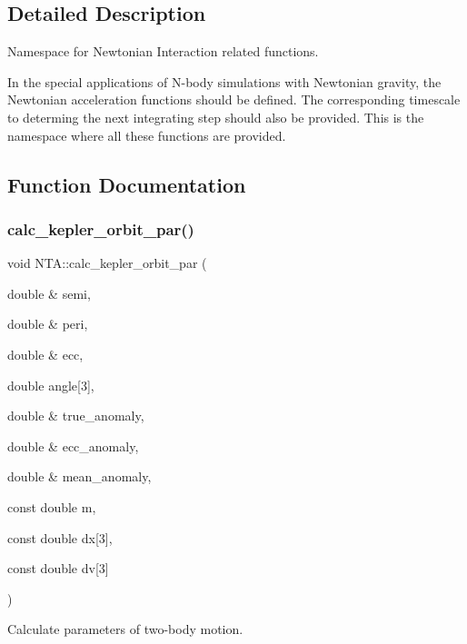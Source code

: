 \subsection{Detailed Description}
Namespace for Newtonian Interaction related functions. 

In the special applications of N-\/body simulations with Newtonian gravity, the Newtonian acceleration functions should be defined. The corresponding timescale to determing the next integrating step should also be provided. This is the namespace where all these functions are provided. 

\subsection{Function Documentation}
\hypertarget{namespaceNTA_a02d22f02e21004b264c8257a5ffbb600}{}\label{namespaceNTA_a02d22f02e21004b264c8257a5ffbb600} 
\subsubsection{\texorpdfstring{calc\+\_\+kepler\+\_\+orbit\+\_\+par()}{calc\_kepler\_orbit\_par()}}
{\footnotesize\ttfamily void N\+T\+A\+::calc\+\_\+kepler\+\_\+orbit\+\_\+par (\begin{DoxyParamCaption}\item[{double \&}]{semi,  }\item[{double \&}]{peri,  }\item[{double \&}]{ecc,  }\item[{double}]{angle\mbox{[}3\mbox{]},  }\item[{double \&}]{true\+\_\+anomaly,  }\item[{double \&}]{ecc\+\_\+anomaly,  }\item[{double \&}]{mean\+\_\+anomaly,  }\item[{const double}]{m,  }\item[{const double}]{dx\mbox{[}3\mbox{]},  }\item[{const double}]{dv\mbox{[}3\mbox{]} }\end{DoxyParamCaption})}



Calculate parameters of two-\/body motion. 

